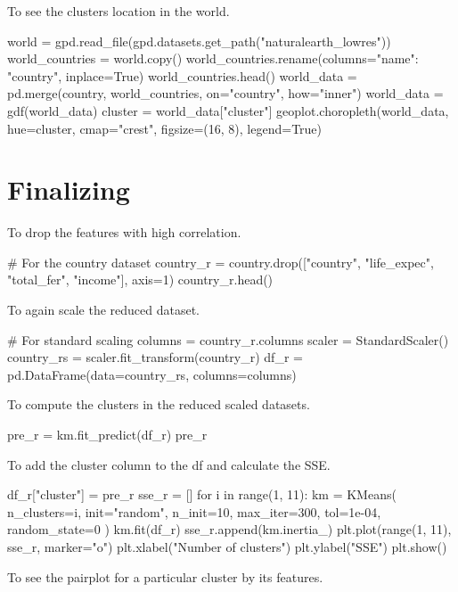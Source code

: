 \documentclass{swfuthesise}
\begin{document}
To see the clusters location in the world. 

\begin{pythoncode}
world = gpd.read_file(gpd.datasets.get_path("naturalearth_lowres"))
world_countries = world.copy()
world_countries.rename(columns={"name": "country"}, inplace=True)
world_countries.head()
world_data = pd.merge(country, world_countries, on="country", how="inner")
world_data = gdf(world_data)
cluster = world_data["cluster"]
geoplot.choropleth(world_data, hue=cluster, cmap="crest", figsize=(16, 8), legend=True)
\end{pythoncode}

\section{Finalizing}

To drop the features with high correlation. 

\begin{pythoncode}
# For the country dataset
country_r = country.drop(["country", "life_expec", "total_fer", "income"], axis=1) 
country_r.head() 
\end{pythoncode}

To again scale the reduced dataset.

\begin{pythoncode}
# For standard scaling
columns = country_r.columns
scaler = StandardScaler()
country_rs = scaler.fit_transform(country_r)
df_r = pd.DataFrame(data=country_rs, columns=columns)
\end{pythoncode}

To compute the clusters in the reduced scaled datasets.

\begin{pythoncode}
pre_r = km.fit_predict(df_r)
pre_r
\end{pythoncode}

To add the cluster column to the df and calculate the SSE.

\begin{pythoncode}
df_r["cluster"] = pre_r
sse_r = []
for i in range(1, 11):
    km = KMeans(
        n_clusters=i, init="random", n_init=10, max_iter=300, tol=1e-04, random_state=0
    )
    km.fit(df_r)
    sse_r.append(km.inertia_)
plt.plot(range(1, 11), sse_r, marker="o")
plt.xlabel("Number of clusters")
plt.ylabel("SSE")
plt.show()
\end{pythoncode}

To see the pairplot for a particular cluster by its features.
\end{document}

